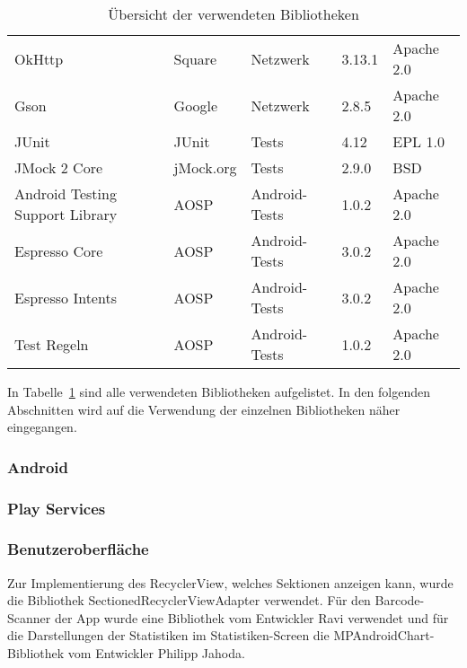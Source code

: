 \begin{table}[h]
\begin{tabularx}{\textwidth}{|X|l|l|l|l|}
        OkHttp & Square & Netzwerk & 3.13.1 & Apache 2.0\\   %
        Gson & Google & Netzwerk & 2.8.5 & Apache 2.0\\   %
        \hline

        JUnit & JUnit & Tests & 4.12 & EPL 1.0\\   %
        JMock 2 Core & jMock.org & Tests & 2.9.0 & BSD\\    %
        \hline

        Android Testing Support Library & AOSP & Android-Tests & 1.0.2 & Apache 2.0\\   %
        Espresso Core & AOSP & Android-Tests & 3.0.2 & Apache 2.0\\    %
        Espresso Intents & AOSP & Android-Tests & 3.0.2 & Apache 2.0\\ %
        Test Regeln & AOSP & Android-Tests & 1.0.2 & Apache 2.0\\  %
        \hline
    \end{tabularx}

    \caption{Übersicht der verwendeten Bibliotheken}
    \label{tab:libraries}
\end{table}

In Tabelle~\ref{tab:libraries} sind alle verwendeten Bibliotheken aufgelistet.
In den folgenden Abschnitten wird auf die Verwendung der einzelnen Bibliotheken näher eingegangen.

\subsubsection{Android} \label{subsubsec:android-libraries}

\subsubsection{Play Services} \label{subsubsec:play-service-libraries}

\subsubsection{Benutzeroberfläche} \label{subsubsec:ui-libraries}
Zur Implementierung des RecyclerView, welches Sektionen anzeigen kann, wurde die Bibliothek SectionedRecyclerViewAdapter verwendet.
Für den Barcode-Scanner der App wurde eine Bibliothek vom Entwickler Ravi verwendet und für die Darstellungen der Statistiken im Statistiken-Screen die MPAndroidChart-Bibliothek vom Entwickler Philipp Jahoda.

